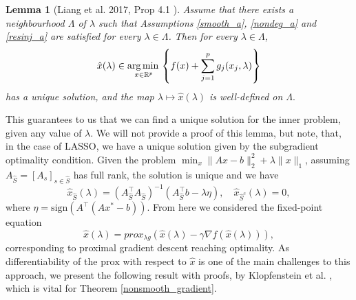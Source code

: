 \documentclass[11pt, twoside]{report}
\newtheorem{lemma}[theorem]{Lemma}
\begin{document}
\begin{lemma}[Liang et al. 2017, Prop 4.1 \cite{liang2017activity}]
\label{lianglem}
Assume that there exists a neighbourhood $\Lambda$ of $\lambda$ such that Assumptions \ref{smooth_a}, \ref{nondeg_a} and \ref{resinj_a} are satisfied for every $\lambda \in \Lambda$. Then for every $\lambda \in \Lambda$, 
\begin{equation} \label{inner_prob}
    \hat{x}(\lambda) \in \underset{x \in \mathbb{R}^p} {\operatorname*{arg\, min \,}} \left\{ f(x) + \sum_{j=1}^p g_j(x_j,\lambda) \right\}
\end{equation}
has a unique solution, and the map $\lambda \mapsto \hat{x}(\lambda)$ is well-defined on $\Lambda.$
\end{lemma}
This guarantees to us that we can find a unique solution for the inner problem, given any value of $\lambda$. We will not provide a proof of this lemma, but note, that, in the case of LASSO, we have a unique solution given by the subgradient optimality condition. Given the problem $\min_x \|Ax-b\|_2^2 + \lambda\|x\|_1$, assuming $A_{\hat{S}} = [A_s]_{s \in \hat{S}}$ has full rank, the solution is unique and we have
\[\hat{x}_{\hat{S}}(\lambda) = (A_{\hat{S}}^\top A_{\hat{S}})^{-1}(A^\top_{\hat{S}}b - \lambda \eta), \quad \hat{x}_{\hat{S}^c}(\lambda) = 0,\]
where $\eta = \mathrm{sign}(A^\top(Ax^*-b)).$
From here we considered the fixed-point equation
\begin{equation*}
    \hat{x}(\lambda) = prox_{\lambda g} \left(\hat{x}(\lambda) - \gamma \nabla f(\hat{x}(\lambda))\right),
\end{equation*}
corresponding to proximal gradient descent reaching optimality. As differentiability of the $\mathrm{prox}$ with respect to $\hat{x}$ is one of the main challenges to this approach, we present the following result with proofs, by Klopfenstein et al. \cite{klopfenstein2020model}, which is vital for Theorem \ref{nonsmooth_gradient}.

\end{document}

